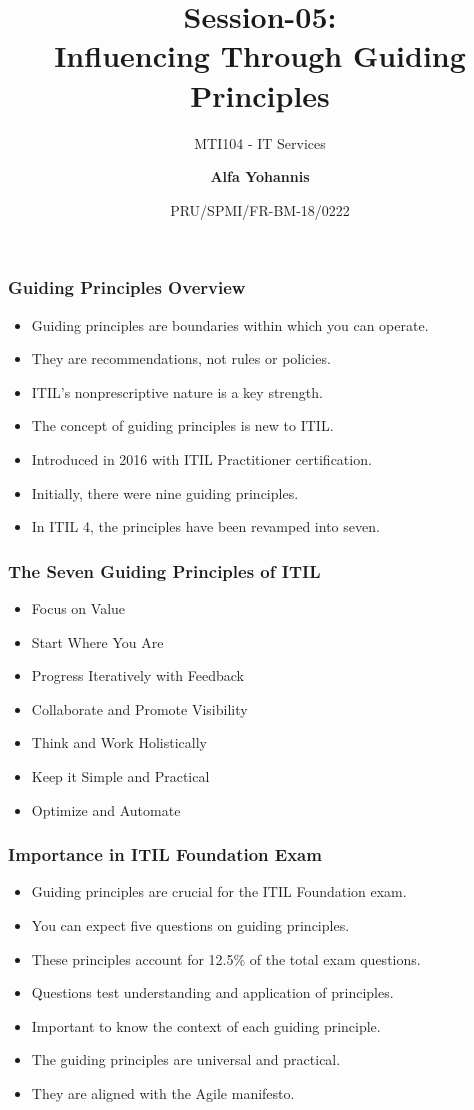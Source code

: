 \documentclass[aspectratio=169, table]{beamer}
\subtitle{MTI104 - IT Services}
\title{Session-05:\\\LARGE{Influencing Through Guiding \\Principles}}
\date[Serial]{\scriptsize {PRU/SPMI/FR-BM-18/0222}}
\author[Pradita]{\small{\textbf{Alfa Yohannis}}}
\begin{document}
\frame{\titlepage}

\begin{frame}
	\frametitle{Guiding Principles Overview}
	\begin{itemize}
		\item Guiding principles are boundaries within which you can operate.
		\item They are recommendations, not rules or policies.
		\item ITIL's nonprescriptive nature is a key strength.
		\item The concept of guiding principles is new to ITIL.
		\item Introduced in 2016 with ITIL Practitioner certification.
		\item Initially, there were nine guiding principles.
		\item In ITIL 4, the principles have been revamped into seven.
	\end{itemize}
\end{frame}

\begin{frame}
	\frametitle{The Seven Guiding Principles of ITIL}
	\begin{itemize}
		\item Focus on Value
		\item Start Where You Are
		\item Progress Iteratively with Feedback
		\item Collaborate and Promote Visibility
		\item Think and Work Holistically
		\item Keep it Simple and Practical
		\item Optimize and Automate
	\end{itemize}
\end{frame}

\begin{frame}
	\frametitle{Importance in ITIL Foundation Exam}
	\begin{itemize}
		\item Guiding principles are crucial for the ITIL Foundation exam.
		\item You can expect five questions on guiding principles.
		\item These principles account for 12.5\% of the total exam questions.
		\item Questions test understanding and application of principles.
		\item Important to know the context of each guiding principle.
		\item The guiding principles are universal and practical.
		\item They are aligned with the Agile manifesto.
	\end{itemize}
\end{frame}
\end{document}
